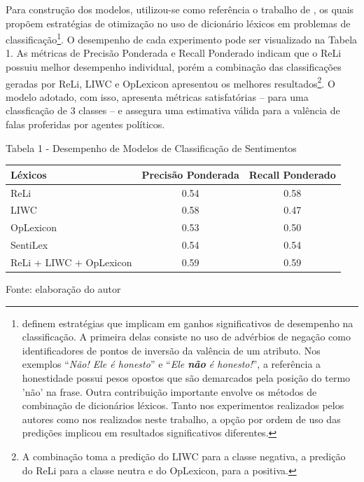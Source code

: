 \documentclass[
12pt,				%
openright,			%
twoside,			%
a4paper,			%
english,			%
french,				%
spanish,			%
brazil				%
]{abntex2}
\begin{document}
Para construção dos modelos, utilizou-se como referência o trabalho de , os quais propõem estratégias de otimização no uso de dicionário léxicos em problemas de classificação\footnote{ definem estratégias que implicam em ganhos significativos de desempenho na classificação. A primeira delas consiste no uso de advérbios de negação como identificadores de pontos de inversão da valência de um atributo. Nos exemplos ``\textit{Não! Ele é honesto}'' e ``\textit{Ele \textbf{não} é honesto!}'', a referência a honestidade possui pesos opostos que são demarcados pela posição do termo 'não' na frase. Outra contribuição importante envolve os métodos de combinação de dicionários léxicos. Tanto nos experimentos realizados pelos autores como nos realizados neste trabalho, a opção por ordem de uso das predições implicou em resultados significativos diferentes.}. O desempenho de cada experimento pode ser visualizado na Tabela 1. As métricas de Precisão Ponderada e Recall Ponderado indicam que o ReLi possuiu melhor desempenho individual, porém a combinação das classificações geradas por ReLi, LIWC e OpLexicon apresentou os melhores resultados\footnote{A combinação toma a predição do LIWC para a classe negativa, a predição do ReLi para a classe neutra e do OpLexicon, para a positiva.}. O modelo adotado, com isso, apresenta métricas satisfatórias -- para uma classficação de 3 classes -- e assegura uma estimativa válida para a valência de falas proferidas por agentes políticos.   

\begin{center}
	Tabela 1 - Desempenho de Modelos de Classificação de Sentimentos
	
	\vspace{0.4cm}
	
	\begin{tabular}{lcc}
		\toprule
		{Léxicos}					& {Precisão Ponderada} 	& {Recall Ponderado} \\ \midrule
		{ReLi} 						& 0.54					& 0.58 \\ 
		{LIWC} 						& 0.58					& 0.47 \\ 
		{OpLexicon} 				& 0.53					& 0.50 \\ 
		{SentiLex} 					& 0.54					& 0.54 \\ 
		{ReLi + LIWC + OpLexicon} 	& 0.59					& 0.59 \\ 
		\bottomrule
	\end{tabular}
	
	\vspace{0.6cm}
	
	Fonte: elaboração do autor
\end{center}     
\end{document}
